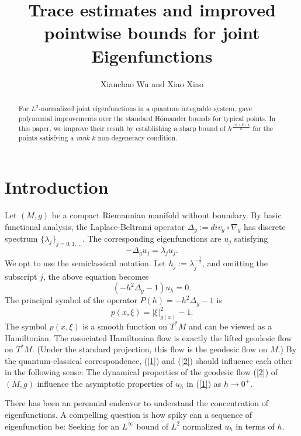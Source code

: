 \documentclass[12pt,reqno]{amsart}
\title[Trace estimates and improved pointwise bounds]{Trace estimates and improved pointwise bounds for joint Eigenfunctions}
\author{Xianchao Wu and Xiao Xiao}
\date{}
\numberwithin{equation}{section}
\begin{document}
\begin{abstract}
For $L^2$-normalized joint eigenfunctions in a quantum integrable system, \cite{GT2020} gave polynomial improvements over the standard H\"omander bounds for typical points. In this paper, we improve their result by establishing a sharp bound of $h^{\frac{-n+k+1}2}$ for the points satisfying a {\em rank $k$} non-degeneracy condition. 
\end{abstract}

\maketitle


\section{Introduction}\label{section1}

Let $(M,g)$ be a compact Riemannian manifold without boundary. By basic functional analysis, the Laplace-Beltrami operator $\Delta_g:=\textit{div}_g\circ\nabla_g$ has discrete spectrum $\{\lambda_j\}_{j=0,1,...}$. The corresponding eigenfunctions are $u_j$ satisfying
$$
-\Delta_gu_j=\lambda_ju_j.
$$
We opt to use the semiclassical notation. Let $h_j:=\lambda_j^{-\frac{1}{2}}$, and omitting the subscript $j$, the above equation becomes
\begin{equation}\label{1}
    (-h^2\Delta_g-1)u_h=0.
\end{equation}
The principal symbol of the operator $P(h)=-h^2\Delta_g-1$ is 
\begin{equation}\label{2}
p(x,\xi)=|\xi|_{g(x)}^2-1.    
\end{equation}
The symbol $p(x,\xi)$ is a smooth function on $T^*M$ and can be viewed as a Hamiltonian. The associated Hamiltonian flow is exactly the lifted geodesic flow on $T^*M$. (Under the standard projection, this flow is the geodesic flow on $M$.) By the quantum-classical correspondence, (\ref{1}) and (\ref{2}) should influence each other in the following sense: The dynamical properties of the geodesic flow (\ref{2}) of $(M,g)$ influence the asymptotic properties of $u_h$ in (\ref{1}) as $h\to 0^+$.

There has been an perennial endeavor to understand the concentration of eigenfunctions. A compelling question is how spiky can a sequence of eigenfunction be: Seeking for an $L^{\infty}$ bound of $L^2$ normalized $u_h$ in terms of $h$. 
\end{document}
